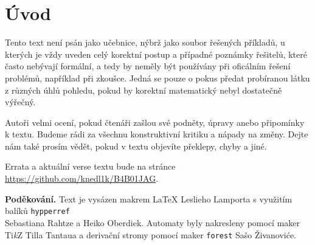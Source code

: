 \section*{Úvod}

\hspace{0.8cm} Tento text není psán jako učebnice, nýbrž jako soubor řešených příkladů, u kterých je vždy uveden celý korektní postup
a případné poznámky řešitelů, které často nebývají formální, a tedy by neměly být používány při oficálním řešení problémů, 
například při zkoušce. Jedná se pouze o pokus předat probíranou látku z různých úhlů pohledu, pokud by korektní matematický
nebyl dostatečně výřečný.

\hspace{0.8cm} Autoři velmi ocení, pokud čtenáři zašlou své podněty, úpravy anebo připomínky k textu. Budeme rádi za všechnu konstruktivní
kritiku a nápady na změny. Dejte nám také prosím vědět, pokud v textu objevíte překlepy, chyby a jiné.

Errata a aktuální verse textu bude na stránce \url{https://github.com/knedl1k/B4B01JAG}.

\textbf{Poděkování.} Text je vysázen makrem \LaTeX{} Leslieho Lamporta s využitím balíků \texttt{hypperref} \\ 
Sebastiana Rahtze a Heiko Oberdiek. Automaty byly nakresleny pomocí maker Ti\textit{k}Z Tilla Tantaua a derivační
stromy pomocí maker \texttt{forest} Sašo Živanoviće.